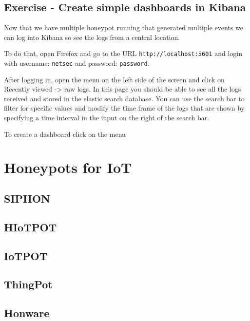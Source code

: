 \documentclass[epsfig,a4paper,11pt,titlepage,oneside,openany]{book}
\begin{document}
\section{Exercise - Create simple dashboards in Kibana}

Now that we have multiple honeypot running that generated multiple events we can log into Kibana so see the logs from a central location.

To do that, open Firefox and go to the URL \texttt{http://localhost:5601} and login with username: \texttt{netsec} and password: \texttt{password}.

After logging in, open the menu on the left side of the screen and click on Recently viewed -> raw logs. In this page you should be able to see all the logs received and stored in the elastic search database. You can use the search bar to filter for specific values and modify the time frame of the logs that are shown by specifying a time interval in the input on the right of the search bar.

To create a dashboard click on the menu 



\chapter{Honeypots for IoT}

\section{SIPHON}

\section{HIoTPOT}

\section{IoTPOT}

\section{ThingPot}

\section{Honware}


\endgroup


%


\end{document}
